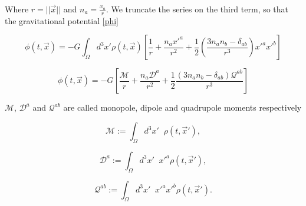 Where $r = ||\vec{x}||$ and $n_a = \frac{x_a}{r}$. We truncate the series on the third term, so that the gravitational potential \ref{phi} 

\begin{equation}\label{multipole0}
\phi(t, \vec{x}) = -G \int_{\Omega} d^3x' \rho(t, \vec{x}) \left[ \frac{1}{r} + \frac{n_a x'^a}{r^2} + \frac{1}{2} \left( \frac{ 3 n_a n_b -\delta_{ab} }{r^3}  \right) x'^a x'^b \right]
\end{equation}


\begin{equation}\label{multipole1}
\phi(t, \vec{x}) = -G \left[ \frac{\mathcal{M}}{r} + \frac{n_a \mathcal{D}^a}{r^2} + \frac{1}{2} \frac{ \left( 3 n_a n_b -\delta_{ab} \right) \mathcal{Q}^{ab} }{r^3} \right]
\end{equation}

$\mathcal{M}$, $\mathcal{D}^a$ and $\mathcal{Q}^{ab}$ are called monopole, dipole and quadrupole moments respectively

\begin{equation}
\mathcal{M} := \int_{\Omega} d^3x' \;\; \rho(t, \vec{x}'),
\end{equation}


\begin{equation}
\mathcal{D}^a := \int_{\Omega} d^3x' \;\; x'^a \rho(t, \vec{x}'),
\end{equation}


\begin{equation}\label{quadrupole}
\mathcal{Q}^{ab} := \int_{\Omega} d^3 x' \;\;x'^a x'^b \rho(t, \vec{x}').
\end{equation}


